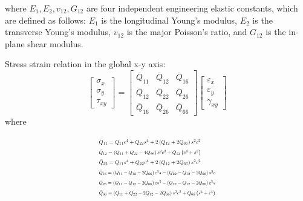 \documentclass[Afour,sagev,times]{sagej}
\begin{document}
where $E_1, E_2, v_{12}, G_{12} $ are four independent engineering elastic constants, which are defined as follows: $E_1 $ is the longitudinal Young's modulus, $E_2 $ is the transverse Young's modulus, $v_{12} $ is the major Poisson's ratio, and $G_{12} $ is the in-plane shear modulus.

Stress strain relation in the global x-y axis:
\begin{equation}\left[\begin{array}{l}\sigma _{x} \\ \sigma _{y} \\ \tau_{xy}\end{array}\right]=\left[\begin{array}{lll}\bar{Q}_{11} & \bar{Q}_{12} & \bar{Q}_{16}\\ \bar{Q}_{12} & \bar{Q}_{22} & \bar{Q}_{26} \\ \bar{Q}_{16} & \bar{Q}_{26} &\bar{Q}_{66}\end{array}\right]\left[\begin{array}{l}\varepsilon_{x} \\ \varepsilon_{y}\\ \gamma_{x y}\end{array}\right]
\end{equation}
where

\begin{equation}
	\begin{array}{l}
		\resizebox{.35\textwidth}{!}{$\bar{Q}_{11}=Q_{11} c^{4}+Q_{22} s^{4}+2\left(Q_{12}+2
		Q_{66}\right) s^{2} c^{2}$} \\

		\resizebox{.35\textwidth}{!}{$\bar{Q}_{12}=\left(Q_{11}+Q_{22}-4 Q_{66}\right) s^{2}
		c^{2}+Q_{12}\left(c^{4}+s^{2}\right)$} \\

		\resizebox{.35\textwidth}{!}{$\bar{Q}_{22}=Q_{11} s^{4}+Q_{22} c^{4}+2\left(Q_{12}+2
		Q_{66}\right) s^{2} c^{2}$} \\

		\resizebox{.4\textwidth}{!}{$\bar{Q}_{16}=\left(Q_{11}-Q_{12}-2 Q_{66}\right) c^{3} s-\left(Q_{22}-Q_{12}-2Q_{66}\right) s^{3} c$}
		 \\ 
		\resizebox{.4\textwidth}{!}{$\bar{Q}_{26}=\left(Q_{11}-Q_{12}-2 Q_{66}\right) c s^{3}-\left(Q_{22}-Q_{12}-2 Q_{66}\right)c^{3} s$}
		 \\ 
	\resizebox{.4\textwidth}{!}	{$\bar{Q}_{66}=\left(Q_{11}+Q_{22}-2 Q_{12}-2 Q_{66}\right)
	s^{2}c^{2}+Q_{66}\left(s^{4}+c^{4}\right)$}\\
	\end{array}
\end{equation}
\end{document}
